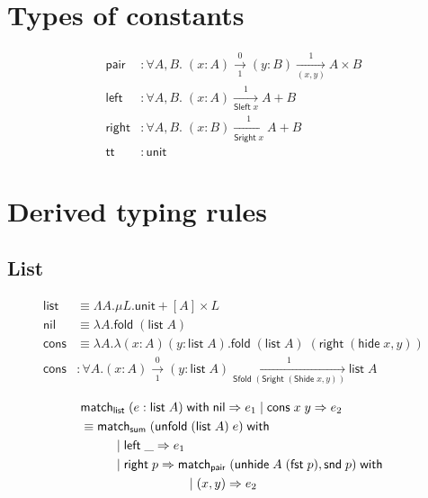 \documentclass{article}
\newcommand{\arrow}[4]{#1\xrightarrow[#3]{#2}#4}
\newcommand{\symmatch}{\mathsf{match}}
\newcommand{\symwith}{\mathsf{\;with\;}}
\newcommand{\symleft}{\mathsf{left}}
\newcommand{\symright}{\mathsf{right}}
\newcommand{\symSleft}{\mathsf{Sleft\;}}
\newcommand{\symSright}{\mathsf{Sright\;}}
\newcommand{\symfold}{\mathsf{fold\;}}
\newcommand{\symSfold}{\mathsf{Sfold\;}}
\newcommand{\symunfold}{\mathsf{unfold\;}}
\newcommand{\symhide}{\mathsf{hide\;}}
\newcommand{\symShide}{\mathsf{Shide\;}}
\newcommand{\symunhide}{\mathsf{unhide\;}}
\newcommand{\sympair}{\mathsf{pair}}
\newcommand{\symtt}{\mathsf{tt}}
\newcommand{\symunit}{\mathsf{unit}}
\newcommand{\symlist}{\mathsf{list}}
\newcommand{\symnil}{\mathsf{nil}}
\newcommand{\symcons}{\mathsf{cons}}
\newcommand{\intro}[2]{(#1 : #2)}
\newcommand{\symsum}{\mathsf{sum}}
\newcommand{\symfst}{\mathsf{fst}}
\newcommand{\symsnd}{\mathsf{snd}}
\begin{document}
\section{Types of constants}

\begin{align*}
\sympair&:\forall A,B.\;\arrow{\intro{x}{A}}{0}{1}{\arrow{\intro{y}{B}}{1}{(x,y)}{A\times B}} \\
\symleft&:\forall A,B.\;\arrow{\intro{x}{A}}{1}{\symSleft x}{A+B} \\
\symright&:\forall A,B.\;\arrow{\intro{x}{B}}{1}{\symSright x}{A+B} \\
\symtt&:\symunit
\end{align*}

\section{Derived typing rules}

\subsection{List}

\begin{align*}
\symlist &\equiv \Lambda A. \mu L. \symunit + [A] \times L \\
\symnil &\equiv \lambda A. \symfold (\symlist\;A) \\
\symcons &\equiv \lambda A. \lambda(x : A)(y : \symlist\;A). \symfold (\symlist\;A)\;(\symright\;(\symhide x,y)) \\
\symcons &: \forall A. \arrow{\intro{x}{A}}{0}{1}{\arrow{\intro{y}{\symlist\;A}}{1}{\symSfold (\symSright (\symShide x, y))}{\symlist\;A}} 
\end{align*}

\begin{align*}
&\symmatch_\symlist\; (e : \symlist\;A) \symwith \symnil \Rightarrow e_1 \;|\; \symcons\;x\;y \Rightarrow e_2 \\
  & \equiv \symmatch_\symsum\;(\symunfold (\symlist\;A)\;e) \symwith \\
  & \hspace{0.4in} |\;\symleft\;\_ \Rightarrow e_1 \\
  & \hspace{0.4in} |\; \symright\;p \Rightarrow \symmatch_\sympair\;(\symunhide A\;(\symfst\;p),\symsnd\;p)\symwith \\
  & \hspace{1.2in} |\; (x,y) \Rightarrow e_2
\end{align*}
\end{document}
